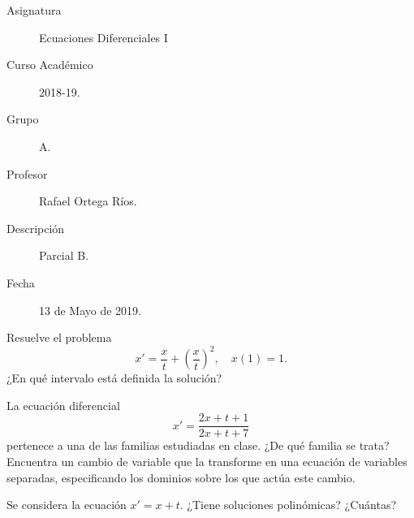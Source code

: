 \documentclass[12pt]{article}
\begin{document}

    
    

    \begin{description}
        \item[Asignatura] Ecuaciones Diferenciales I
        \item[Curso Académico] 2018-19.
        \item[Grupo] A.
        \item[Profesor] Rafael Ortega Ríos.
        \item[Descripción] Parcial B.
        \item[Fecha] 13 de Mayo de 2019.
    
    \end{description}
    \newpage

    \begin{ejercicio}
        Resuelve el problema
        \begin{equation*}
            x' = \dfrac{x}{t} + \left(\dfrac{x}{t}\right)^2, \quad x(1) = 1.
        \end{equation*}
        ¿En qué intervalo está definida la solución?
    \end{ejercicio}

    \begin{ejercicio}
        La ecuación diferencial
        \begin{equation*}
            x' = \dfrac{2x + t + 1}{2x + t + 7}
        \end{equation*}
        pertenece a una de las familias estudiadas en clase. ¿De qué familia se trata?
        Encuentra un cambio de variable que la transforme en una ecuación de variables separadas, especificando los dominios sobre los que actúa este cambio.
    \end{ejercicio}

    \begin{ejercicio}
        Se considera la ecuación $x' = x+t$. ¿Tiene soluciones polinómicas? ¿Cuántas?
    \end{ejercicio}
\end{document}
